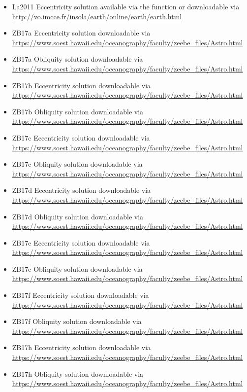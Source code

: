 \documentclass[a4paper]{book}
\begin{document}
\begin{Description}
\begin{itemize}
\item{} La2011 Eccentricity solution available via the  function or downloadable via \url{http://vo.imcce.fr/insola/earth/online/earth/earth.html}
\item{} ZB17a Eccentricity solution downloadable via \url{https://www.soest.hawaii.edu/oceanography/faculty/zeebe_files/Astro.html}
\item{} ZB17a Obliquity solution downloadable via \url{https://www.soest.hawaii.edu/oceanography/faculty/zeebe_files/Astro.html}
\item{} ZB17b Eccentricity solution downloadable via \url{https://www.soest.hawaii.edu/oceanography/faculty/zeebe_files/Astro.html}
\item{} ZB17b Obliquity solution downloadable via \url{https://www.soest.hawaii.edu/oceanography/faculty/zeebe_files/Astro.html}
\item{} ZB17c Eccentricity solution downloadable via \url{https://www.soest.hawaii.edu/oceanography/faculty/zeebe_files/Astro.html}
\item{} ZB17c Obliquity solution downloadable via \url{https://www.soest.hawaii.edu/oceanography/faculty/zeebe_files/Astro.html}
\item{} ZB17d Eccentricity solution downloadable via \url{https://www.soest.hawaii.edu/oceanography/faculty/zeebe_files/Astro.html}
\item{} ZB17d Obliquity solution downloadable via \url{https://www.soest.hawaii.edu/oceanography/faculty/zeebe_files/Astro.html}
\item{} ZB17e Eccentricity solution downloadable via \url{https://www.soest.hawaii.edu/oceanography/faculty/zeebe_files/Astro.html}
\item{} ZB17e Obliquity solution downloadable via \url{https://www.soest.hawaii.edu/oceanography/faculty/zeebe_files/Astro.html}
\item{} ZB17f Eccentricity solution downloadable via \url{https://www.soest.hawaii.edu/oceanography/faculty/zeebe_files/Astro.html}
\item{} ZB17f Obliquity solution downloadable via \url{https://www.soest.hawaii.edu/oceanography/faculty/zeebe_files/Astro.html}
\item{} ZB17h Eccentricity solution downloadable via \url{https://www.soest.hawaii.edu/oceanography/faculty/zeebe_files/Astro.html}
\item{} ZB17h Obliquity solution downloadable via \url{https://www.soest.hawaii.edu/oceanography/faculty/zeebe_files/Astro.html}

\end{itemize}
\end{Description}
\end{document}

